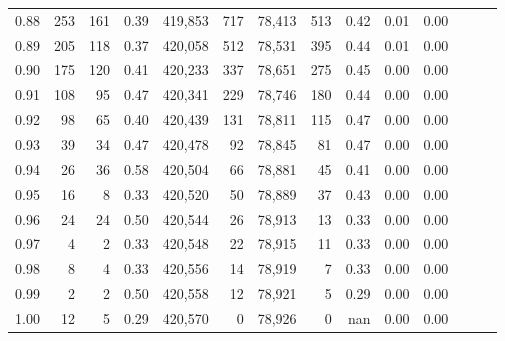 \begin{tabular}{rrrrrrrrrrrrrr}
0.88 &     253 &    161 &  0.39 &  419,853 &      717 &  78,413 &     513 &  0.42 &  0.01 &      0.00 \\
0.89 &     205 &    118 &  0.37 &  420,058 &      512 &  78,531 &     395 &  0.44 &  0.01 &      0.00 \\
0.90 &     175 &    120 &  0.41 &  420,233 &      337 &  78,651 &     275 &  0.45 &  0.00 &      0.00 \\
0.91 &     108 &     95 &  0.47 &  420,341 &      229 &  78,746 &     180 &  0.44 &  0.00 &      0.00 \\
0.92 &      98 &     65 &  0.40 &  420,439 &      131 &  78,811 &     115 &  0.47 &  0.00 &      0.00 \\
0.93 &      39 &     34 &  0.47 &  420,478 &       92 &  78,845 &      81 &  0.47 &  0.00 &      0.00 \\
0.94 &      26 &     36 &  0.58 &  420,504 &       66 &  78,881 &      45 &  0.41 &  0.00 &      0.00 \\
0.95 &      16 &      8 &  0.33 &  420,520 &       50 &  78,889 &      37 &  0.43 &  0.00 &      0.00 \\
0.96 &      24 &     24 &  0.50 &  420,544 &       26 &  78,913 &      13 &  0.33 &  0.00 &      0.00 \\
0.97 &       4 &      2 &  0.33 &  420,548 &       22 &  78,915 &      11 &  0.33 &  0.00 &      0.00 \\
0.98 &       8 &      4 &  0.33 &  420,556 &       14 &  78,919 &       7 &  0.33 &  0.00 &      0.00 \\
0.99 &       2 &      2 &  0.50 &  420,558 &       12 &  78,921 &       5 &  0.29 &  0.00 &      0.00 \\
1.00 &      12 &      5 &  0.29 &  420,570 &        0 &  78,926 &       0 &   nan &  0.00 &      0.00 \\
\bottomrule
\end{tabular}

